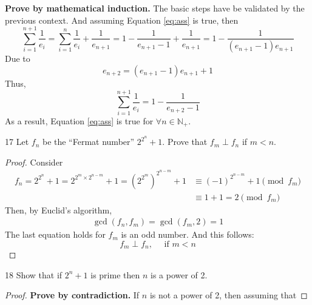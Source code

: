 \documentclass[a4paper,12pt]{article}
\makeatletter
\newtheorem*{solution}{Solution}
\theoremstyle{definition}
\renewenvironment{solution}[1][Solution] {\par\pushQED{\qed}\normalfont\topsep6\p@\@plus6\p@\relax\trivlist\item[\hskip\labelsep\bfseries#1\@addpunct{.}]\ignorespaces}{\popQED\endtrivlist\@endpefalse} \makeatother
\newenvironment{problems}{\begin{list}{}{\renewcommand{\makelabel}[1]{\textbf{##1}\hfil}}}{\end{list}}
\makeatother
\begin{document}
\begin{problems}
\begin{solution}
        \textbf{Prove by mathematical induction.} The basic steps have be validated by the previous context. And assuming Equation \eqref{eq:ass} is true, then
        \begin{equation*}
            \sum_{i=1}^{n+1} \frac{1}{e_i} = \sum_{i=1}^n \frac{1}{e_i} + \frac{1}{e_{n+1}} = 1 - \frac{1}{e_{n+1}-1} + \frac{1}{e_{n+1}} = 1 - \frac{1}{(e_{n+1}-1)e_{n+1}}
        \end{equation*}
        Due to 
        \begin{equation*}
            e_{n+2} = (e_{n+1}-1)e_{n+1} + 1
        \end{equation*}
        Thus,
        \begin{equation*}
            \sum_{i=1}^{n+1} \frac{1}{e_i} = 1 - \frac{1}{e_{n+2}-1}
        \end{equation*}
        As a result, Equation \eqref{eq:ass} is true for $\forall n \in \mathbb{N}_+$.
    \end{solution} 
    \item[17]Let $f_n$ be the ``Fermat number'' $2^{2^n}+1$.  Prove that $f_m \perp  f_n$ if $m < n$.
    \begin{proof}
        Consider
        \begin{align*}
            f_n = 2^{2^n} + 1 = 2^{2^m\times 2^{n-m}} + 1 = (2^{2^m})^{2^{n-m}} + 1 &\equiv (-1)^{2^{n-m}} + 1 \pmod{f_m}\\
            &\equiv 1 + 1 = 2 \pmod{f_m}
        \end{align*}
        Then, by Euclid's algorithm,
        \begin{align*}
            \gcd(f_n,f_m) = \gcd(f_m,2) = 1
        \end{align*}
        The last equation holds for $f_m$ is an odd number. And this follows:
        \begin{equation*}
            f_m \perp f_n,\quad \text{ if }m<n
        \end{equation*}
    \end{proof} 
    \item[18] Show that if $2^n+1$ is prime then $n$ is a power of 2.
    \begin{proof}
        \textbf{Prove by contradiction.} If $n$ is not a power of 2, then assuming that

\end{proof}
\end{problems}
\end{document}
